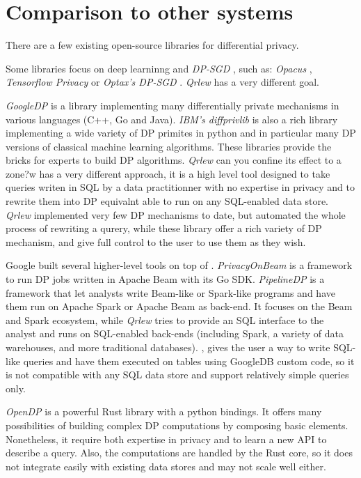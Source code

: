 \documentclass[letterpaper]{article} %
\newcommand{\qrlew}{\emph{Qrlew}}
\begin{document}
\section{Comparison to other systems}

There are a few existing open-source libraries for differential privacy.

Some libraries focus on deep learninng and \emph{DP-SGD} \cite{abadi2016deep}, such as: \emph{Opacus} \cite{yousefpour2021opacus}, \emph{Tensorflow Privacy} \cite{TensorFlowPrivacy} or \emph{Optax's DP-SGD} \cite{deepmind2020jax}. \qrlew{} has a very different goal.

\emph{GoogleDP} \cite{GoogleDP} is a library implementing many differentially private mechanisms in various languages (C++, Go and Java).
\emph{IBM's diffprivlib} \cite{diffprivlib} is also a rich library implementing a wide variety of DP primites in python and in particular many DP versions of classical machine learning algorithms. 
These libraries provide the bricks for experts to build DP algorithms. \qrlew{} can you confine its effect to a zone?w{} has a very different approach, it is a high level tool designed to take queries writen in SQL by a data practitionner with no expertise in privacy and to rewrite them into DP equivalnt able to run on any SQL-enabled data store. \qrlew{} implemented very few DP mechanisms to date, but automated the whole process of rewriting a qurery, while these library offer a rich variety of DP mechanism, and give full control to the user to use them as they wish.

Google built several higher-level tools on top of \cite{GoogleDP}.
\emph{PrivacyOnBeam} \cite{PrivacyOnBeam} is a framework to run DP jobs written in Apache Beam with its Go SDK.
\emph{PipelineDP} \cite{PipelineDP} is a framework that let analysts write Beam-like or Spark-like programs and have them run on Apache Spark or Apache Beam as back-end. It focuses on the Beam and Spark ecosystem, while \qrlew{} tries to provide an SQL interface to the analyst and runs on SQL-enabled back-ends (including Spark, a variety of data warehouses, and more traditional databases).
\cite{ZetaSQL}, gives the user a way to write SQL-like queries and have them executed on tables using GoogleDB custom code, so it is not  compatible with any SQL data store and support relatively simple queries only.

\emph{OpenDP} \cite{OpenDP} is a powerful Rust library with a python bindings. It offers many possibilities of building complex DP computations by composing basic elements. Nonetheless, it require both expertise in privacy and to learn a new API to describe a query. Also, the computations are handled by the Rust core, so it does not integrate easily with existing data stores and may not scale well either.
\end{document}
